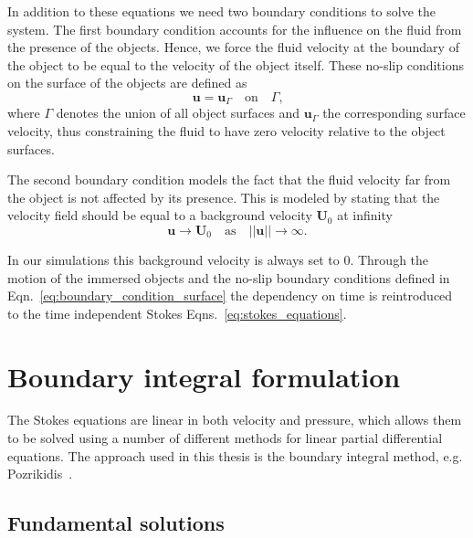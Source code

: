 In addition to these equations we need two boundary conditions to solve the system. The first boundary condition accounts for the influence on the fluid from the presence of the objects. Hence, we force the fluid velocity at the boundary of the object to be equal to the velocity of the object itself. These no-slip conditions on the surface of the objects are defined as
\begin{equation}
  \label{eq:boundary_condition_surface}
  \mathbf{u} = \mathbf{u}_\Gamma  \quad \text{on} \quad  \Gamma \text{,}
\end{equation}
where $\Gamma$ denotes the union of all object surfaces and $\mathbf{u}_\Gamma$ the corresponding surface velocity, thus constraining the fluid to have zero velocity relative to the object surfaces.

The second boundary condition models the fact that the fluid velocity far from the object is not affected by its presence. This is modeled by stating that the velocity field should be equal to a background velocity $\mathbf{U}_0$ at infinity
\begin{equation}
  \label{eq:boundary_condition_background}
  \mathbf{u} \rightarrow \mathbf{U}_0 \quad \text{as} \quad ||\mathbf{u}|| \rightarrow \infty \text{.}
\end{equation}

In our simulations this background velocity is always set to $0$. Through the motion of the immersed objects and the no-slip boundary conditions defined in Eqn.~\eqref{eq:boundary_condition_surface} the dependency on time is reintroduced to the time independent Stokes Eqns.~\eqref{eq:stokes_equations}.

\section{Boundary integral formulation}
\label{sec:boundary_integral_formulation}

The Stokes equations are linear in both velocity and pressure, which allows them to be solved using a number of different methods for linear partial differential equations. The approach used in this thesis is the boundary integral method, e.g. Pozrikidis~\cite{Pozrikidis1992}.

\subsection{Fundamental solutions}
\label{subsec:fundamental_solutions}

